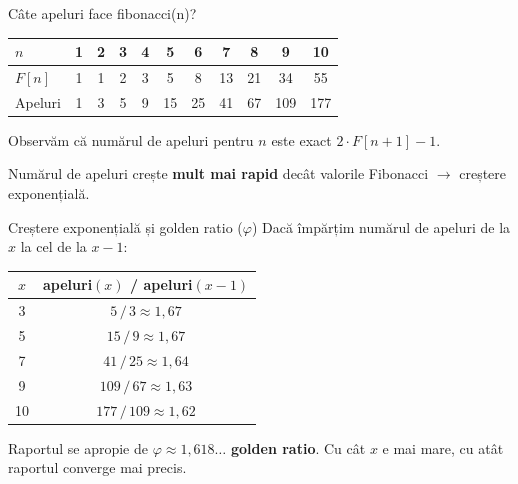 \documentclass{beamer}
\begin{document}
\begin{frame}{Câte apeluri face fibonacci(n)?}
  \begin{center}
  \begin{tabular}{lcccccccccc}
    \toprule
    $n$       & 1 & 2 & 3 & 4 & 5  & 6  & 7  & 8  & 9   & 10  \\
    \midrule
    $F[n]$    & 1 & 1 & 2 & 3 & 5  & 8  & 13 & 21 & 34  & 55  \\
    Apeluri   & 1 & 3 & 5 & 9 & 15 & 25 & 41 & 67 & 109 & 177 \\
    \bottomrule
  \end{tabular}
  \end{center}

  \smallskip
  Observăm că numărul de apeluri pentru $n$ este exact $2 \cdot F[n+1] - 1$.

  \smallskip
  Numărul de apeluri crește \textbf{mult mai rapid} decât valorile Fibonacci $\rightarrow$ creștere exponențială.
\end{frame}

\begin{frame}{Creștere exponențială și golden ratio ($\varphi$)}
  Dacă împărțim numărul de apeluri de la $x$ la cel de la $x-1$:

  \smallskip
  \begin{center}
  \begin{tabular}{cc}
    \toprule
    $x$ & apeluri$(x)$ / apeluri$(x-1)$ \\
    \midrule
    3  & $5\,/\,3   \approx 1{,}67$ \\
    5  & $15\,/\,9  \approx 1{,}67$ \\
    7  & $41\,/\,25 \approx 1{,}64$ \\
    9  & $109\,/\,67  \approx 1{,}63$ \\
    10 & $177\,/\,109 \approx 1{,}62$ \\
    \bottomrule
  \end{tabular}
  \end{center}

  \smallskip
  Raportul se apropie de $\varphi \approx 1{,}618\ldots$ \textemdash{} \textbf{golden ratio}. Cu cât $x$ e mai mare, cu atât raportul converge mai precis.
\end{frame}
\end{document}
